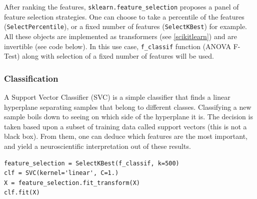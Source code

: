 \documentclass{frontiersSCNS} %
\newcounter{x}
\newcounter{y}
\begin{document}
After ranking the features, \verb!sklearn.feature_selection! proposes a panel
of feature selection strategies. One can choose to take a percentile of the features
(\verb!SelectPercentile!), or a fixed number of features (\verb!SelectKBest!)
for example. All these objects are implemented as transformers (see
\ref{scikitlearn}) and are invertible (see code below).
In this use case, \verb!f_classif! function (ANOVA F-Test) along with selection
of a fixed number of features will be used.

\subsubsection{Classification}

A Support Vector Classifier (SVC) is a simple classifier that finds a linear
hyperplane separating samples that belong to different classes. 
Classifying a new sample boils down to
seeing on which side of the hyperplane it is.
The decision is taken based upon a subset of training data called
support vectors (this is not a black box). From them, one can deduce which
features are the most important, and yield a neuroscientific interpretation out
of these results.

\begin{lstlisting}
feature_selection = SelectKBest(f_classif, k=500)
clf = SVC(kernel='linear', C=1.)
X = feature_selection.fit_transform(X)
clf.fit(X)
\end{lstlisting}



\end{document}
